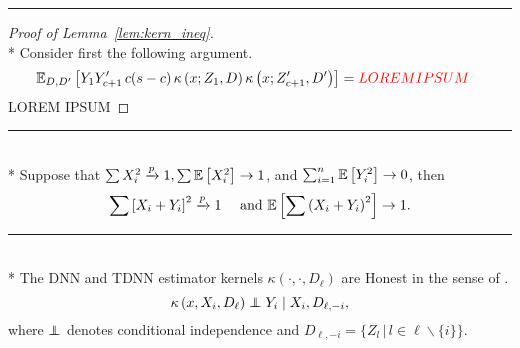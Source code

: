 \hrule

\begin{proof}[Proof of Lemma~\ref{lem:kern_ineq}]\mbox{}\\*
	Consider first the following argument.
	\begin{equation}
		\begin{aligned}
			& \mathbb{E}_{D, D^{\prime}}\left[Y_{1}Y_{c+1}^{\prime} \, c(s-c) \, \kappa\left(x; Z_{1}, D\right)\kappa\left(x; Z_{c+1}^{\prime}, D^{\prime}\right)\right]
			= {\color{red} LOREM IPSUM}
		\end{aligned}
	\end{equation}
	{\color{red} LOREM IPSUM}
\end{proof}

\hrule

\begin{lem}\label{lem:peng1}\mbox{}\\*
	Suppose that $\sum X_{i}^2 \xrightarrow{p} 1, \sum \mathbb{E}\left[X_{i}^2\right] \rightarrow 1$, and $\sum_{i=1}^n \mathbb{E}\left[Y_{i}^2\right] \rightarrow 0$, then
	\begin{equation}
		\sum\left[X_{i}+Y_{i}\right]^2 \xrightarrow{p} 1 \quad \text { and } \mathbb{E}\left[\sum\left(X_{i}+Y_{i}\right)^2\right] \rightarrow 1.
	\end{equation}
\end{lem}

\hrule

\begin{lem}\label{lem:honesty}\mbox{}\\*
	The DNN and TDNN estimator kernels $\kappa\left(\cdot, \cdot, D_{\ell}\right)$ are Honest in the sense of \citet{wager_estimation_2018}.
	\begin{equation*}
		\kappa\left(x, X_{i}, D_{\ell}\right) \perp\!\!\!\!\perp Y_{i} \mid X_{i}, D_{\ell,-i},
	\end{equation*}
	where $\perp\!\!\!\!\perp$ denotes conditional independence and $D_{\ell,-i} = \{Z_l \, | \, l \in \ell \backslash \{i\}\}$.
\end{lem}